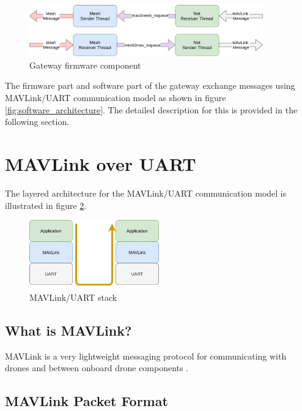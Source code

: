 \documentclass[\main/main.tex]{subfiles}
\begin{document}
\begin{figure}[H]
    \begin{center}
        \includegraphics[width=0.9\textwidth]{gateway_firmware.png}
    \end{center}
    \caption{Gateway firmware component}
    \label{fig:gateway_firmware}
\end{figure}

The firmware part and software part of the gateway exchange messages using MAVLink/UART communication model as shown in figure \ref{fig:software_architecture}. The detailed description for this is provided in the following section.

\section{MAVLink over UART}
The layered architecture for the MAVLink/UART communication model is illustrated in figure \ref{fig:mavlink_uart_stack}.
\begin{figure}[H]
    \begin{center}
        \includegraphics[width=0.5\textwidth]{MAVLink_over_UART.png}
    \end{center}
    \caption{MAVLink/UART stack}
    \label{fig:mavlink_uart_stack}
\end{figure}

\subsection{What is MAVLink?}
MAVLink is a very lightweight messaging protocol for communicating with drones and between onboard drone components \cite{web_mavlink}.

\subsection{MAVLink Packet Format}
\end{document}
